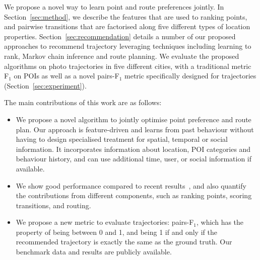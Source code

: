 We propose a novel way to learn point and route preferences jointly.
In Section~\ref{sec:method}, we describe the features that are used to ranking points,
and pairwise transitions that are factorised along five different types of location properties.
Section~\ref{sec:recommendation} details a number of our proposed approaches to recommend trajectory leveraging techniques including
learning to rank, Markov chain inference and route planning.
We evaluate the proposed algorithms on photo trajectories in five different cities, with a traditional metric F$_1$ on POIs as well as a novel pairs-F$_1$ metric specifically designed for trajectories (Section~\ref{sec:experiment}).

The main contributions of this work are as follows:
\begin{itemize}
\setlength{\itemsep}{-2pt}
\item We propose a novel algorithm to jointly optimise point preference and route plan.
Our approach is feature-driven and learns from past behaviour without having to design specialised treatment for spatial, temporal or social information. It incorporates information about location, POI categories and behaviour history, and can use additional time, user, or social information if available.
\item We show good performance compared to recent results~\cite{ijcai15}, and also quantify the contributions from different components, such as ranking points, scoring transitions, and routing.
\item We propose a new metric to evaluate trajectories: pairs-F$_1$, which has the property of being between 0 and 1, and being 1 if and only if the recommended trajectory is exactly the same as the ground truth. Our benchmark data and results are publicly available.
\end{itemize}
